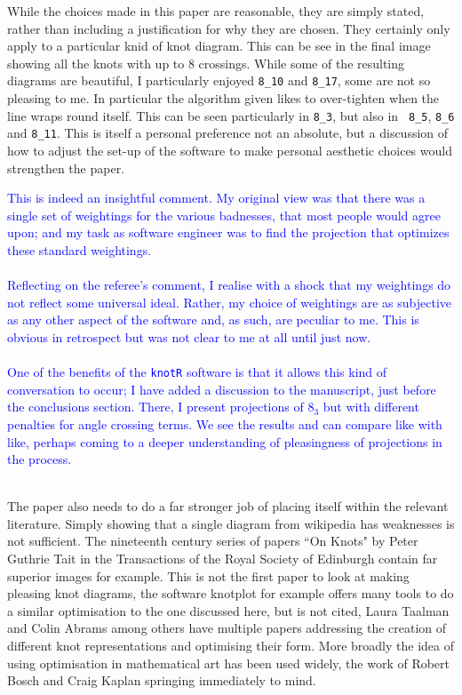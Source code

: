 \documentclass[12pt]{article}
\begin{document}
While the choices made in this paper
are reasonable, they are simply stated, rather than including a
justification for why they are chosen. They certainly only apply to a
particular knid of knot diagram. This can be see in the final image
showing all the knots with up to 8 crossings. While some of the
resulting diagrams are beautiful, I particularly enjoyed {\tt 8\_10}
and {\tt 8\_17}, some are not so pleasing to me. In particular the
algorithm given likes to over-tighten when the line wraps round
itself. This can be seen particularly in {\tt 8\_3}, but also in {\tt
  8\_5}, {\tt 8\_6} and {\tt 8\_11}. This is itself a personal
preference not an absolute, but a discussion of how to adjust the
set-up of the software to make personal aesthetic choices would
strengthen the paper.

\textcolor{blue}{This is indeed an insightful comment.  My original
  view was that there was a single set of weightings for the various
  badnesses, that most people would agree upon; and my task as
  software engineer was to find the projection that optimizes these
  standard weightings.\\ \\ Reflecting on the referee's comment, I
  realise with a shock that my weightings do not reflect some
  universal ideal.  Rather, my choice of weightings are as subjective
  as any other aspect of the software and, as such, are peculiar to
  me.  This is obvious in retrospect but was not clear to me at all
  until just now.\\ \\ One of the benefits of the {\tt knotR} software
  is that it allows this kind of conversation to occur; I have added a
  discussion to the manuscript, just before the conclusions section.
  There, I present projections of $8_3$ but with different penalties
  for angle crossing terms.  We see the results and can compare like
  with like, perhaps coming to a deeper understanding of pleasingness
  of projections in the process.\\ \\}

The paper also needs to do a far stronger job of placing itself within
the relevant literature. Simply showing that a single diagram from
wikipedia has weaknesses is not sufficient. The nineteenth century
series of papers ``On Knots" by Peter Guthrie Tait in the Transactions
of the Royal Society of Edinburgh contain far superior images for
example. This is not the first paper to look at making pleasing knot
diagrams, the software knotplot for example offers many tools to do a
similar optimisation to the one discussed here, but is not cited,
Laura Taalman and Colin Abrams among others have multiple papers
addressing the creation of different knot representations and
optimising their form. More broadly the idea of using optimisation in
mathematical art has been used widely, the work of Robert Bosch and
Craig Kaplan springing immediately to mind.
\end{document}
